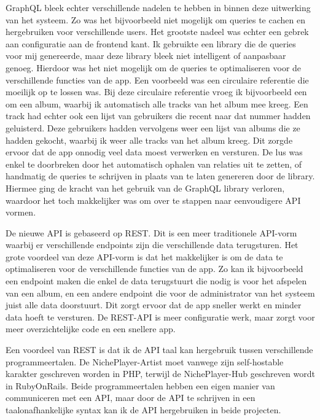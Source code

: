GraphQL bleek echter verschillende nadelen te hebben in binnen deze uitwerking van het systeem. Zo was het bijvoorbeeld niet mogelijk om queries te cachen en hergebruiken voor verschillende users. Het grootste nadeel was echter een gebrek aan configuratie aan de frontend kant. Ik gebruikte een library die de queries voor mij genereerde, maar deze library bleek niet intelligent of aanpasbaar genoeg. Hierdoor was het niet mogelijk om de queries te optimaliseren voor de verschillende functies van de app. Een voorbeeld was een circulaire referentie die moeilijk op te lossen was. Bij deze circulaire referentie vroeg ik bijvoorbeeld een om een album, waarbij ik automatisch alle tracks van het album mee kreeg. Een track had echter ook een lijst van gebruikers die recent naar dat nummer hadden geluisterd. Deze gebruikers hadden vervolgens weer een lijst van albums die ze hadden gekocht, waarbij ik weer alle tracks van het album kreeg. Dit zorgde ervoor dat de app onnodig veel data moest verwerken en versturen. De lus was enkel te doorbreken door het automatisch ophalen van relaties uit te zetten, of handmatig de queries te schrijven in plaats van te laten genereren door de library. Hiermee ging de kracht van het gebruik van de GraphQL library verloren, waardoor het toch makkelijker was om over te stappen naar eenvoudigere API vormen.

De nieuwe API is gebaseerd op REST. Dit is een meer traditionele API-vorm waarbij er verschillende endpoints zijn die verschillende data terugsturen. Het grote voordeel van deze API-vorm is dat het makkelijker is om de data te optimaliseren voor de verschillende functies van de app. Zo kan ik bijvoorbeeld een endpoint maken die enkel de data terugstuurt die nodig is voor het afspelen van een album, en een andere endpoint die voor de administrator van het systeem juist alle data doorstuurt. Dit zorgt ervoor dat de app sneller werkt en minder data hoeft te versturen. De REST-API is meer configuratie werk, maar zorgt voor meer overzichtelijke code en een snellere app.

Een voordeel van REST is dat ik de API taal kan hergebruik tussen verschillende programmeertalen. De NichePlayer-Artist moet vanwege zijn self-hostable karakter geschreven worden in PHP, terwijl de NichePlayer-Hub geschreven wordt in RubyOnRails. Beide programmeertalen hebben een eigen manier van communiceren met een API, maar door de API te schrijven in een taalonafhankelijke syntax kan ik de API hergebruiken in beide projecten.

